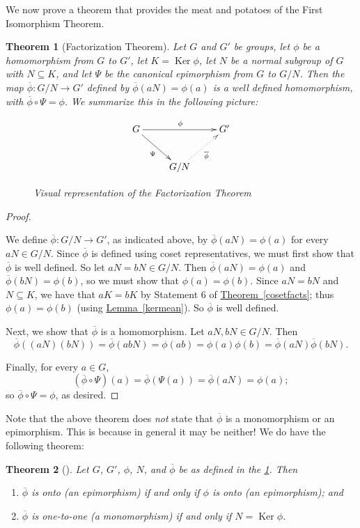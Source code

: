 \documentclass[10pt,]{book}
\theoremstyle{plain}
\newtheorem{theorem}{Theorem}[section]
\theoremstyle{definition}
\theoremstyle{definition}
\theoremstyle{definition}
\theoremstyle{definition}
\numberwithin{equation}{section}
\def\phibar{\overline{\phi}}
\DeclareMathOperator{\Ker}{Ker}
\begin{document}
We now prove a theorem that provides the meat and potatoes of the First Isomorphism Theorem.%
\begin{theorem}[{Factorization Theorem}]\label{facthm}
Let \(G\) and \(G'\) be groups, let \(\phi\) be a homomorphism from \(G\) to \(G'\), let \(K=\Ker \phi\), let \(N\) be a normal subgroup of \(G\) with \(N\subseteq K\), and let \(\Psi\) be the canonical epimorphism from \(G\) to \(G/N\). Then the map \(\phibar: G/N \to G'\) defined by \(\phibar(aN)=\phi(a)\) is a well defined homomorphism, with \(\phibar \circ \Psi=\phi\).%
We  summarize this in the following picture:%
\begin{figure}
\centering
{
\[\xymatrix{G\ar[rr]^{\phi}\ar[dr]_{\Psi}&&G'\\&G/N\ar@{.>}[ur]_{\phibar}&}\]
}
\caption{Visual representation of the Factorization Theorem\label{figure-9}}
\end{figure}
\end{theorem}
\begin{proof}\hypertarget{proof-51}{}
We define \(\phibar: G/N\to G'\), as indicated above, by \(\phibar(aN)=\phi(a)\) for every \(aN\in G/N\). Since \(\phibar\) is defined using coset representatives, we must first show that \(\phibar\) is well defined. So let \(aN=bN\in G/N\). Then \(\phibar(aN)=\phi(a)\) and \(\phibar(bN)=\phi(b)\), so we must show that \(\phi(a)=\phi(b)\). Since \(aN=bN\) and \(N\subseteq K\), we have that \(aK=bK\) by Statement 6 of \hyperref[cosetfacts]{Theorem~\ref{cosetfacts}}; thus \(\phi(a)=\phi(b)\) (using \hyperref[kermean]{Lemma~\ref{kermean}}). So \(\phibar\) is well defined.%
\par
Next, we show that \(\phibar\) is a homomorphism. Let \(aN,bN\in
G/N\). Then%
\begin{equation*}
\phibar((aN)(bN))=\phibar(abN)=\phi(ab)=\phi(a)\phi(b)=\phibar(aN)\phibar(bN).
\end{equation*}
%
\par
Finally, for every \(a\in G\),%
\begin{equation*}
(\phibar \circ
\Psi)(a)=\phibar(\Psi(a))=\phibar(aN)=\phi(a);
\end{equation*}
so \(\phibar \circ
\Psi = \phi\), as desired.%
\end{proof}
Note that the above theorem does \emph{not} state that \(\phibar\) is a monomorphism or an epimorphism. This is because in general it may be neither! We do have the following theorem:%
\begin{theorem}[{}]\label{epimono}
Let \(G\), \(G'\), \(\phi\), \(N\), and \(\phibar\) be as defined in the  \hyperref[facthm]{\ref{facthm}}. Then \leavevmode%
\begin{enumerate}
\item\hypertarget{li-498}{}\(\phibar\) is onto (an epimorphism) if and only if \(\phi\) is onto (an epimorphism); and%
\item\hypertarget{li-499}{}\(\phibar\) is one-to-one (a monomorphism) if and only if \(N=\Ker
\phi\).%
\end{enumerate}
%
\end{theorem}
\end{document}
